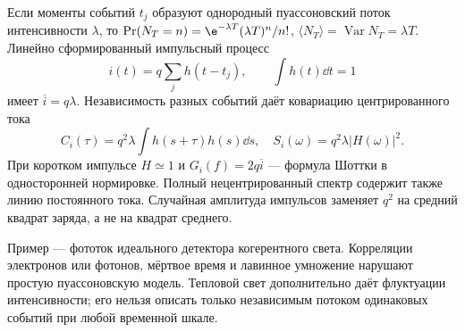 
Если моменты событий $t_j$ образуют однородный пуассоновский поток интенсивности $\lambda$, то $\Pr(N_T=n)=\e^{-\lambda T}(\lambda T)^n/n!$, $\langle N_T\rangle=\operatorname{Var}N_T=\lambda T$. Линейно сформированный импульсный процесс
\begin{equation}
 i(t)=q\sum_jh(t-t_j),\qquad \int h(t)\dd t=1
\end{equation}
имеет $\overline i=q\lambda$. Независимость разных событий даёт ковариацию центрированного тока
\begin{equation}
 C_i(\tau)=q^2\lambda\int h(s+\tau)h(s)\dd s,
 \quad S_i(\omega)=q^2\lambda|H(\omega)|^2.
\end{equation}
При коротком импульсе $H\simeq1$ и $G_i(f)=2q\overline i$ — формула Шоттки в односторонней нормировке. Полный нецентрированный спектр содержит также линию постоянного тока. Случайная амплитуда импульсов заменяет $q^2$ на средний квадрат заряда, а не на квадрат среднего.

Пример — фототок идеального детектора когерентного света. Корреляции электронов или фотонов, мёртвое время и лавинное умножение нарушают простую пуассоновскую модель. Тепловой свет дополнительно даёт флуктуации интенсивности; его нельзя описать только независимым потоком одинаковых событий при любой временной шкале.
